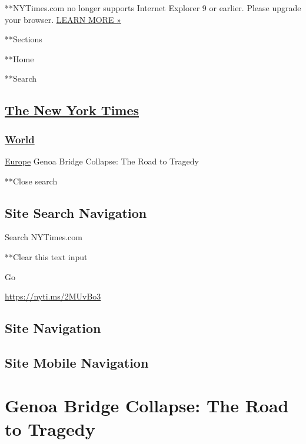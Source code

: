  **NYTimes.com no longer supports Internet Explorer 9 or earlier. Please
upgrade your browser.
\href{http://www.nytimes3xbfgragh.onion/content/help/site/ie9-support.html}{LEARN
MORE »}

**Sections

**Home

**Search

\hypertarget{the-new-york-times}{%
\subsection{\texorpdfstring{\href{http://www.nytimes3xbfgragh.onion/}{The
New York Times}}{The New York Times}}\label{the-new-york-times}}

\hypertarget{-world-}{%
\subsubsection{\texorpdfstring{ \href{/section/world}{World}
}{ World }}\label{-world-}}

 \href{/section/world/europe}{Europe} \textbar{}Genoa Bridge Collapse:
The Road to Tragedy

**Close search

\hypertarget{site-search-navigation}{%
\subsection{Site Search Navigation}\label{site-search-navigation}}

Search NYTimes.com

**Clear this text input

Go

\url{https://nyti.ms/2MUvBo3}

\hypertarget{site-navigation}{%
\subsection{Site Navigation}\label{site-navigation}}

\hypertarget{site-mobile-navigation}{%
\subsection{Site Mobile Navigation}\label{site-mobile-navigation}}

\hypertarget{genoa-bridge-collapse-the-road-to-tragedy}{%
\section{Genoa Bridge Collapse: The Road to
Tragedy}\label{genoa-bridge-collapse-the-road-to-tragedy}}

